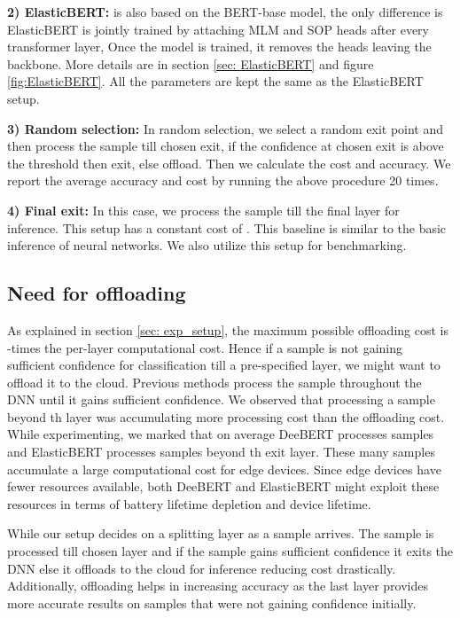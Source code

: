     
\textbf{2) ElasticBERT:} is also based on the BERT-base model, the only difference is ElasticBERT is jointly trained by attaching MLM and SOP heads after every transformer layer, Once the model is trained, it removes the heads leaving the backbone. More details are in section \ref{sec: ElasticBERT} and figure \ref{fig:ElasticBERT}. All the parameters are kept the same as the ElasticBERT setup.

\textbf{3) Random selection:} In random selection, we select a random exit point and then process the sample till chosen exit, if the confidence at chosen exit is above the threshold then exit, else offload. Then we calculate the cost and accuracy. We report the average accuracy and cost by running the above procedure 20 times.

\textbf{4) Final exit:} In this case, we process the sample till the final layer for inference. This setup has a constant cost of . This baseline is similar to the basic inference of neural networks. We also utilize this setup for benchmarking.

\vspace{-0.5cm}
\subsection{Need for offloading}
As explained in section \ref{sec: exp_setup}, the maximum possible offloading cost is -times the per-layer computational cost. Hence if a sample is not gaining sufficient confidence for classification till a pre-specified layer, we might want to offload it to the cloud. Previous methods process the sample throughout the DNN until it gains sufficient confidence. We observed that processing a sample beyond th layer was accumulating more processing cost than the offloading cost. While experimenting, we marked that on average DeeBERT processes  samples and ElasticBERT processes  samples beyond th exit layer. These many samples accumulate a large computational cost for edge devices. Since edge devices have fewer resources available, both DeeBERT and ElasticBERT might exploit these resources in terms of battery lifetime depletion and device lifetime.



While our setup decides on a splitting layer as a sample arrives. The sample is processed till chosen layer and if the sample gains sufficient confidence it exits the DNN else it offloads to the cloud for inference reducing cost drastically. Additionally, offloading helps in increasing accuracy as the last layer provides more accurate results on samples that were not gaining confidence initially. 



